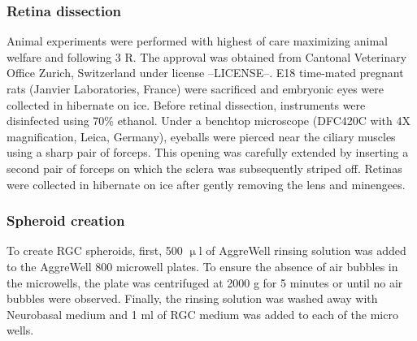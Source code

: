 

\subsubsection{Retina dissection}
\label{dissection}
Animal experiments were performed with highest of care maximizing animal welfare
and following 3 R. The approval was obtained from Cantonal Veterinary Office
Zurich, Switzerland under license --LICENSE--. E18 time-mated pregnant
rats (Janvier Laboratories, France) were sacrificed and embryonic eyes were
collected in hibernate on ice. Before retinal dissection, instruments were
disinfected using 70\% ethanol. Under a benchtop microscope (DFC420C with 4X
magnification, Leica, Germany), eyeballs were pierced near the ciliary muscles
using a sharp pair of forceps. This opening was carefully extended by inserting
a second pair of forceps on which the sclera was subsequently striped off.
Retinas were collected in hibernate on ice after gently removing the lens and
minengees.

\subsubsection{Spheroid creation}
To create RGC spheroids, first, 500 $\upmu$l of
AggreWell\textsuperscript{\texttrademark} rinsing solution was added to the
AggreWell\textsuperscript{\texttrademark} 800 microwell plates. To ensure the
absence of air bubbles in the microwells, the plate was centrifuged at 2000 g
for 5 minutes or until no air bubbles were observed. Finally, the rinsing
solution was washed away with Neurobasal medium and 1 ml of RGC medium was added
to each of the micro wells. \\

